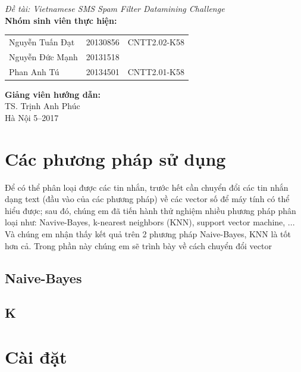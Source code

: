 \documentclass[a4paper,12pt]{report}
\renewcommand{\contentsname}{Mục lục}
\begin{document}
\begin{center}
{\fontsize{18}{20}\selectfont \emph{Đề tài:  Vietnamese SMS Spam Filter Datamining Challenge }}\\[2cm]
\hspace{-5cm}\fontsize{14}{16}\selectfont \textbf{Nhóm sinh viên thực hiện:}\\[0.1cm] 
\begin{longtable}{l c c}
Nguyễn Tuấn Đạt & 20130856 & CNTT2.02-K58 \\
Nguyễn Đức Mạnh & 20131518 & \\
Phan Anh Tú &   20134501 & CNTT2.01-K58\\
\end{longtable}

\hspace{-6cm}\fontsize{14}{16}\selectfont \textbf{Giảng viên hướng dẫn:}\\[0.1cm]
\hspace{-2.7cm}\fontsize{14}{16}\selectfont TS. Trịnh Anh Phúc \\[3.0cm]
\fontsize{16}{19}\selectfont Hà Nội 5--2017
\end{center}
\newpage
\pdfbookmark{\contentsname}{toc}
\tableofcontents
\listoffigures

\chapter{Các phương pháp sử dụng}
Để có thể phân loại được các tin nhắn, trước hết cần chuyển đổi các tin nhắn dạng text (đầu vào của các phương pháp) về các vector số để máy tính có thể hiểu được; sau đó, chúng em đã tiến hành thử nghiệm nhiều phương pháp phân loại như: Navive-Bayes, k-nearest neighbors (KNN), support vector machine, ... Và chúng em nhận thấy kết quả trên 2 phương pháp Naive-Bayes, KNN là tốt hơn cả. Trong phần này chúng em sẽ trình bày về cách chuyển đổi vector 
\section{Naive-Bayes}

\section{K}

\chapter{Cài đặt}

\begin{thebibliography}{9}


\end{thebibliography}
\end{document}
